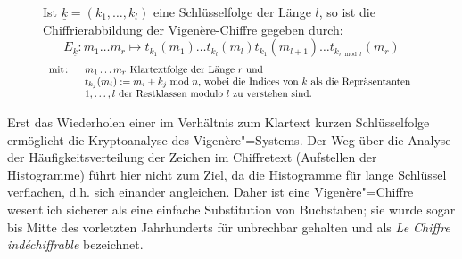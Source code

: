 
\begin{figure}[h]
	Ist $\underline k = (k_1,\ldots,k_{l})$ eine Schlüsselfolge der Länge $l$, so ist die Chiffrierabbildung der Vigen\`ere-Chiffre gegeben durch:
	\begin{equation*}
		E_{\underline k} : m_1\ldots m_{r} \mapsto t_{k_1}(m_1)\ldots t_{k_{l}}(m_{l})t_{k_1}(m_{l+1})\ldots t_{k_{r\bmod{l}}}(m_{r})
	\end{equation*}
	\begin{equation*}
		\begin{array}{rp{14cm}}
	    		{\rm mit\colon\ }		& $m_1\ldots m_{r}$ Klartextfolge der Länge $r$ und\\
							& $t_{k_j}(m_i) := m_i + k_j \bmod{n}$, wobei die Indices von $k$ als die Repräsentanten\\
							& $1,\dots,l$ der Restklassen modulo $l$ zu verstehen sind.
		\end{array}
 	\end{equation*}
 \end{figure}

Erst das Wiederholen einer im Verhältnis zum Klartext kurzen Schlüsselfolge ermöglicht die Kryptoanalyse des Vigenère"=Systems.
Der Weg über die Analyse der Häufigkeitsverteilung der Zeichen im Chiffretext (Aufstellen der Histogramme) führt hier nicht zum Ziel, da die Histogramme für
lange Schlüssel verflachen, d.h. sich einander angleichen. Daher ist eine Vigen\`ere"=Chiffre wesentlich sicherer als eine einfache Substitution von
Buchstaben; sie wurde sogar bis Mitte des vorletzten Jahrhunderts für unbrechbar gehalten und als \emph{Le Chiffre ind\'{e}chiffrable} bezeichnet.


